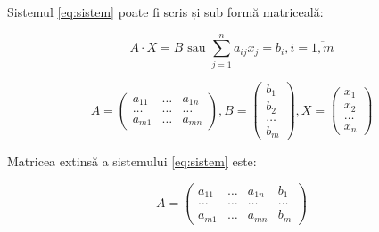 \documentclass[9pt,a4paper]{article}
\begin{document}
Sistemul \eqref{eq:sistem} poate fi scris și sub formă matriceală:

$$A \cdot X = B \text{ sau } \sum_{j=1}^n a_{ij}x_j = b_i, i = \overline{1, m}$$

$$A = 
\begin{pmatrix}
    a_{11} & \dots & a_{1n} \\ 
    \dots & \dots & \dots \\ 
    a_{m1} & \dots & a_{mn}
\end{pmatrix}, 
B = \begin{pmatrix}
    b_1 \\ b_2 \\ \dots \\ b_m
\end{pmatrix}, 
X = \begin{pmatrix}
    x_1 \\ x_2 \\ \dots \\ x_n
\end{pmatrix}
$$

Matricea extinsă a sistemului \eqref{eq:sistem} este:

$$ \bar{A} = 
\begin{pmatrix}
    a_{11} & \dots & a_{1n} & b_1 \\ 
    \dots & \dots & \dots & \dots \\ 
    a_{m1} & \dots & a_{mn} & b_m
\end{pmatrix}
$$
\end{document}
